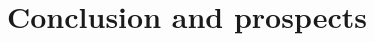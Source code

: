 \begin{comment}
\subsection{Trigger requirements}
\section{Baseline event selection}
\section{Data driven background estimation}
\section{Regions and channels}
\section{Construction of template distributions}
\section{Systematic uncertainties}

\section{Limit setting procedure}
\section{Result and discussion}
\end{comment}
\chapter{Conclusion and prospects}





\begin{appendices}

\addappheadtotoc



\end{appendices}


